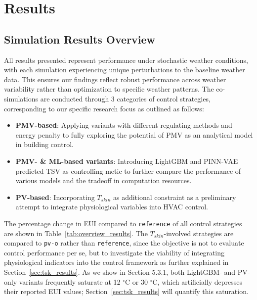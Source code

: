 \section{Results}

\subsection{Simulation Results Overview}
All results presented represent performance under stochastic weather conditions, with each simulation experiencing unique perturbations to the baseline weather data. This ensures our findings reflect robust performance across weather variability rather than optimization to specific weather patterns. The co-simulations are conducted through 3 categories of control strategies, corresponding to our specific research focus as outlined as follows:
\begin{itemize}
    \item \textbf{PMV-based}: Applying variants with different regulating methods and energy penalty to fully exploring the potential of PMV as an analytical model in building control.
    \item \textbf{PMV- \& ML-based variants}: Introducing LightGBM and PINN-VAE predicted TSV as controlling metic to further compare the performance of various models and the tradeoff in computation resources.
    \item \textbf{PV-based}: Incorporating $T_{skin}$ as additional constraint as a preliminary attempt to integrate physiological variables into HVAC control.
\end{itemize}
The percentage change in EUI compared to \texttt{reference} of all control strategies are shown in Table~\ref{tab:overview_results}. The $T_{skin}$-involved strategies are compared to \texttt{pv-o} rather than \texttt{reference}, since the objective is not to evaluate control performance per se, but to investigate the viability of integrating physiological indicators into the control framework as further explained in Section~\ref{sec:tsk_results}. As we show in Section 5.3.1, both LightGBM‐ and PV‐only variants frequently saturate at 12 $^\circ$C or 30 $^\circ$C, which artificially depresses their reported EUI values; Section~\ref{sec:tsk_results} will quantify this saturation.


